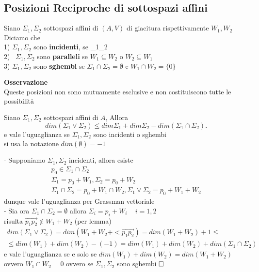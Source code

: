 \documentclass[12px]{article}
\begin{document}
	\subsection{Posizioni Reciproche di sottospazi affini}
	\begin{defi}
		Siano $\Sigma_1,\Sigma_2$ sottospazi affini di $(A,V)$ di giacitura rispettivamente $W_1,W_2$ Diciamo che \\
		1) $\Sigma_1,\Sigma_2$ sono \textbf{incidenti}, se \Sigma_1\cap\Sigma_2\neq\emptyset\\
		2) \ $\Sigma_1,\Sigma_2$ sono \textbf{paralleli} se $W_1\subseteq W_2$ o $W_2\subseteq W_1$\\
		3) $\Sigma_1,\Sigma_2$ sono \textbf{sghembi} se $\Sigma_1\cap\Sigma_2 = \emptyset$ e $W_1\cap W_2 = \{0\}$
	\end{defi}
	\textbf{Osservazione} \\
	Queste posizioni non sono mutuamente esclusive e non costituiscono tutte le possibilità\\
\begin{prop}
	Siano $\Sigma_1, \Sigma_2 $ sottospazi affini di $A$, Allora 
	\[
	dim(\Sigma_1 \vee \Sigma_2) \leq dim\Sigma_1 + dim\Sigma_2 - dim(\Sigma_1\cap\Sigma_2)
	.\] 
	e vale l'uguaglianza se $\Sigma_1, \Sigma_2$ sono incidenti o sghembi\\
	si usa la notazione $dim(\emptyset) = -1$
\end{prop}
\begin{dimo}
	- Supponiamo $\Sigma_1,\Sigma_2$ incidenti, allora esiste
\begin{gather*}
	p_0 \in\Sigma_1\cap\Sigma_2 \\
	\Sigma_1 = p_0 + W_1, \Sigma_2 = p_0 + W_2\\
	\Sigma_1\cap\Sigma_2 = p_0 + W_1\cap W_2, \Sigma_1\vee\Sigma_2 = p_0 + W_1 + W_2
\end{gather*}
	dunque vale l'uguaglianza per Grassman vettoriale\\
	- Sia ora $\Sigma_1\cap\Sigma_2 = \emptyset$ allora $\Sigma_i = p_i + W_i$ ~ $i = 1, 2$\\
	risulta $\overrightarrow{p_1p_2}\notin W_1 + W_2$ (per lemma)\\
	\begin{gather*}
		dim(\Sigma_1\vee\Sigma_2) = dim(W_1 + W_2 + <\overrightarrow{p_1p_2}) = dim(W_1+W_2) + 1\leq \\ \leq dim(W_1) + dim(W_2) - (-1) = dim(W_1) + dim(W_2) + dim(\Sigma_1\cap\Sigma_2)
	\end{gather*}
	e vale l'uguaglianza se e solo se $dim(W_1) + dim(W_2) = dim(W_1 + W_2)$ ovvero $W_1\cap W_2 = {0}$ ovvero se $\Sigma_1, \Sigma_2$ sono sghembi $\hfill\square$	
\end{dimo}
\end{document}
